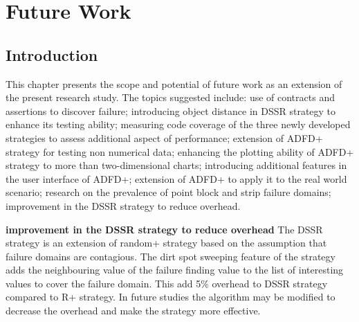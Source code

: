 
\chapter{Future Work}
\label{chap:futureWork}

\section{Introduction}\label{sec:intro8}
	
This chapter presents the scope and potential of future work as an extension of the present research study. The topics suggested include: use of contracts and assertions to discover failure; introducing object distance in DSSR strategy to enhance its testing ability; measuring code coverage of the three newly developed strategies to assess additional aspect of performance; extension of ADFD+ strategy for testing non numerical data; enhancing the plotting ability of ADFD+ strategy to more than two-dimensional charts; introducing additional features in the user interface of ADFD+; extension of ADFD+ to apply it to the real world scenario; research on the prevalence of point block and strip failure domains; improvement in the DSSR strategy to reduce overhead. 

	


\textbf{improvement in the DSSR strategy to reduce overhead}
The DSSR strategy is an extension of random+ strategy based on the assumption that failure domains are contagious. The dirt spot sweeping feature of the strategy adds the neighbouring value of the failure finding value to the list of interesting values to cover the failure domain. This add 5\% overhead to DSSR strategy compared to R+ strategy. In future studies the algorithm may be modified to decrease the overhead and make the strategy more effective.

